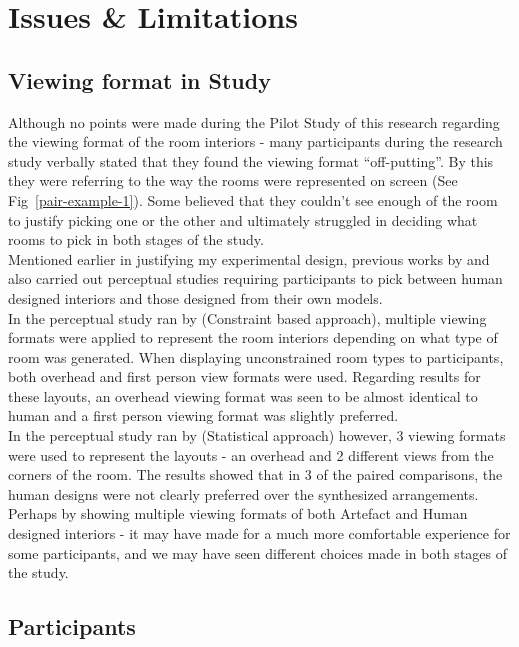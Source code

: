 \section{Issues \& Limitations}
\subsection{Viewing format in Study}
Although no points were made during the Pilot Study of this research regarding the viewing format of the room interiors - many participants during the research study verbally stated that they found the viewing format ``off-putting''. By this they were referring to the way the rooms were represented on screen (See Fig~\ref{pair-example-1}). Some believed that they couldn't see enough of the room to justify picking one or the other and ultimately struggled in deciding what rooms to pick in both stages of the study.
\\
Mentioned earlier in justifying my experimental design, previous works by  \cite{constrained-layouts} and  \cite{make-it-home} also carried out perceptual studies requiring participants to pick between human designed interiors and those designed from their own models.
\\
In the perceptual study ran by  \cite{constrained-layouts} (Constraint based approach), multiple viewing formats were applied to represent the room interiors depending on what type of room was generated. When displaying unconstrained room types to participants, both overhead and first person view formats were used. Regarding results for these layouts, an overhead viewing format was seen to be almost identical to human and a first person viewing format was slightly preferred.
\\
In the perceptual study ran by  \cite{make-it-home} (Statistical approach) however, 3 viewing formats were used to represent the layouts - an overhead and 2 different views from the corners of the room. The results showed that in 3 of the paired comparisons, the human designs were not clearly preferred over the synthesized arrangements.
\\
Perhaps by showing multiple viewing formats of both Artefact and Human designed interiors - it may have made for a much more comfortable experience for some participants, and we may have seen different choices made in both stages of the study.

\subsection{Participants}